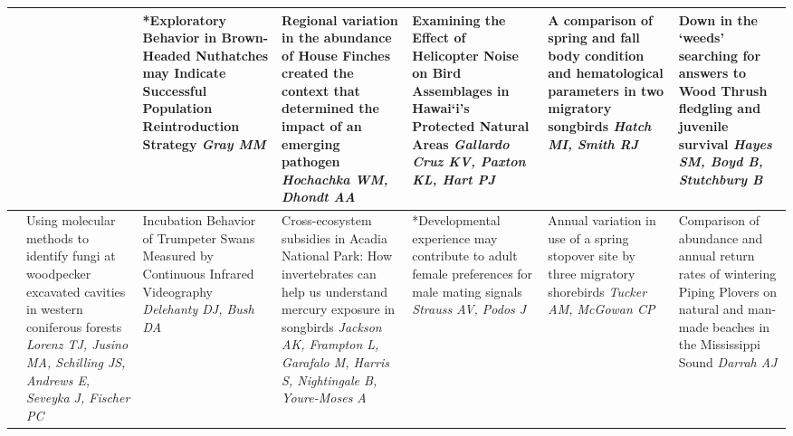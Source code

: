 \begin{tabular}{|x{0.75cm}|a{2.25cm}|x{2.25cm}|x{2.25cm}|x{2.25cm}|x{2.25cm}|x{2.25cm}|}
& \newline \newline \textit{} & *Exploratory Behavior in Brown-Headed Nuthatches may Indicate Successful Population Reintroduction Strategy \newline \newline \textit{Gray MM} & Regional variation in the abundance of House Finches created the context that determined the impact of an emerging pathogen \newline \newline \textit{Hochachka WM, Dhondt AA} & Examining the Effect of Helicopter Noise on Bird Assemblages in Hawai‘i's Protected Natural Areas \newline \newline \textit{Gallardo Cruz KV, Paxton KL, Hart PJ} & A comparison of spring and fall body condition and hematological parameters in two migratory songbirds \newline \newline \textit{Hatch MI, Smith RJ} & Down in the ‘weeds’ searching for answers to Wood Thrush fledgling and juvenile survival \newline \newline \textit{Hayes SM, Boyd B, Stutchbury B}\\
\hline
{}&Using molecular methods to identify fungi at woodpecker excavated cavities in western coniferous forests \newline \newline \textit{Lorenz TJ, Jusino MA, Schilling JS, Andrews E, Seveyka J, Fischer PC} & Incubation Behavior of Trumpeter Swans Measured by Continuous Infrared Videography \newline \newline \textit{Delehanty DJ, Bush DA} & Cross-ecosystem subsidies in Acadia National Park: How invertebrates can help us understand mercury exposure in songbirds \newline \newline \textit{Jackson AK, Frampton L, Garafalo M, Harris S, Nightingale B, Youre-Moses A} & *Developmental experience may contribute to adult female preferences for male mating signals \newline \newline \textit{Strauss AV, Podos J} & Annual variation in use of a spring stopover site by three migratory shorebirds \newline \newline \textit{Tucker AM, McGowan CP} & Comparison of abundance and annual return rates of wintering Piping Plovers on natural and man-made beaches in the Mississippi Sound \newline \newline \textit{Darrah AJ}\\

\end{tabular}
